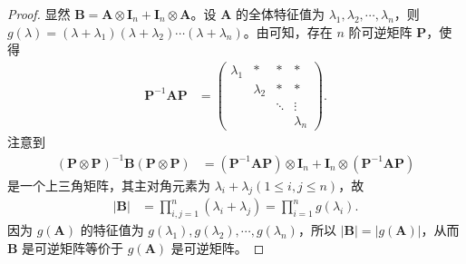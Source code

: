 \documentclass[../../main.tex]{subfiles}
\begin{document}
\begin{proof}
显然 $\boldsymbol{B} = \boldsymbol{A} \otimes \boldsymbol{I}_n + \boldsymbol{I}_n \otimes \boldsymbol{A}$。设 $\boldsymbol{A}$ 的全体特征值为 $\lambda_1, \lambda_2, \cdots, \lambda_n$，则 $g(\lambda) = (\lambda + \lambda_1)(\lambda + \lambda_2)\cdots(\lambda + \lambda_n)$。由可知，存在 $n$ 阶可逆矩阵 $\boldsymbol{P}$，使得
\begin{align*}
\boldsymbol{P}^{-1}\boldsymbol{AP} &= 
\begin{pmatrix}
\lambda_1 & * & * & * \\
 & \lambda_2 & * & * \\
 & & \ddots & \vdots \\
 & & & \lambda_n
\end{pmatrix}.
\end{align*}
注意到
\begin{align*}
(\boldsymbol{P} \otimes \boldsymbol{P})^{-1}\boldsymbol{B}(\boldsymbol{P} \otimes \boldsymbol{P}) &= (\boldsymbol{P}^{-1}\boldsymbol{AP}) \otimes \boldsymbol{I}_n + \boldsymbol{I}_n \otimes (\boldsymbol{P}^{-1}\boldsymbol{AP})
\end{align*}
是一个上三角矩阵，其主对角元素为 $\lambda_i + \lambda_j (1 \leqslant  i, j \leqslant  n)$，故
\begin{align*}
|\boldsymbol{B}| &= \prod_{i,j = 1}^{n} (\lambda_i + \lambda_j) = \prod_{i = 1}^{n} g(\lambda_i).
\end{align*}
因为 $g(\boldsymbol{A})$ 的特征值为 $g(\lambda_1), g(\lambda_2), \cdots, g(\lambda_n)$，所以 $|\boldsymbol{B}| = |g(\boldsymbol{A})|$，从而 $\boldsymbol{B}$ 是可逆矩阵等价于 $g(\boldsymbol{A})$ 是可逆矩阵。

\end{proof}
\end{document}
